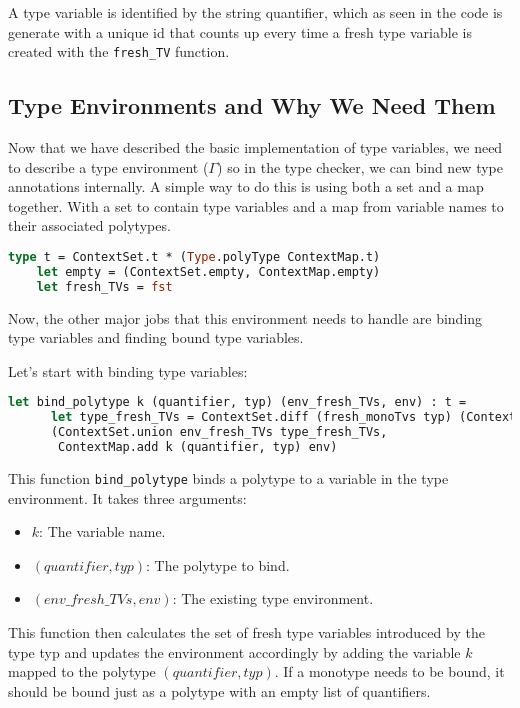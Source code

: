 \documentclass{l4proj}
\begin{document}
A type variable is identified by the string quantifier, which as seen in the code is generate with a unique id that counts up every time a fresh type variable is created with the \texttt{fresh\_TV} function.

\subsection{Type Environments and Why We Need Them}

Now that we have described the basic implementation of type variables, we need to describe a type environment ($\Gamma$) so in the type checker, we can bind new type annotations internally.
A simple way to do this is using both a set and a map together.
With a set to contain type variables and a map from variable names to their associated polytypes.

\begin{lstlisting}[language=Caml]
    type t = ContextSet.t * (Type.polyType ContextMap.t)
    let empty = (ContextSet.empty, ContextMap.empty)
    let fresh_TVs = fst
\end{lstlisting}

Now, the other major jobs that this environment needs to handle are binding type variables and finding bound type variables.

Let's start with binding type variables:

\begin{lstlisting}[language=Caml]
    let bind_polytype k (quantifier, typ) (env_fresh_TVs, env) : t =
      let type_fresh_TVs = ContextSet.diff (fresh_monoTvs typ) (ContextSet.of_list quantifier) in
      (ContextSet.union env_fresh_TVs type_fresh_TVs,
       ContextMap.add k (quantifier, typ) env)
\end{lstlisting}

This function \texttt{bind\_polytype} binds a polytype to a variable in the type environment.
It takes three arguments:
\begin{itemize}
    \item $k$: The variable name.
    \item $(quantifier, typ)$: The polytype to bind.
    \item $(env\_fresh\_TVs, env)$: The existing type environment.
\end{itemize}

This function then calculates the set of fresh type variables introduced by the type typ and updates the environment accordingly by adding the variable $k$ mapped to the polytype $(quantifier, typ)$.
If a monotype needs to be bound, it should be bound just as a polytype with an empty list of quantifiers.
\end{document}

